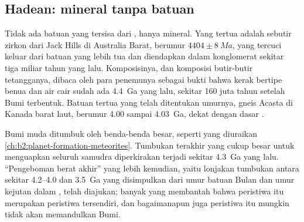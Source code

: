 \begin{omfigure}
\par{}
\end{omfigure}

\subsection*{Hadean: mineral tanpa batuan}

Tidak ada batuan yang tersisa dari , hanya mineral. Yang tertua adalah sebutir zirkon dari Jack
Hills di Australia Barat, berumur $4404 \pm \qty{8}{Ma}$, yang tercuci keluar dari batuan yang lebih tua dan diendapkan
dalam konglomerat sekitar tiga miliar tahun yang lalu. Komposisinya, dan komposisi butir-butir
tetangganya, dibaca oleh para penemunya sebagai bukti bahwa kerak bertipe benua dan
air cair sudah ada \qty{4.4}{Ga} yang lalu, sekitar 160 juta tahun setelah Bumi
terbentuk. Batuan tertua yang telah ditentukan umurnya, gneis Acasta di Kanada barat laut, berumur 4.00 sampai
\qty{4.03}{Ga}, dekat dengan dasar .

Bumi muda ditumbuk oleh benda-benda besar, seperti yang diuraikan \cref{ch:b2:planet-formation-meteorites}.
Tumbukan terakhir yang cukup besar untuk menguapkan
seluruh samudra diperkirakan terjadi sekitar \qty{4.3}{Ga} yang lalu. ``Pengeboman berat
akhir'' yang lebih kemudian, yaitu lonjakan tumbukan antara sekitar 4.2--4.0 dan \qty{3.5}{Ga} yang disimpulkan dari
umur batuan Bulan dan umur kejutan dalam , telah diajukan; banyak yang membantah bahwa peristiwa itu
merupakan peristiwa tersendiri, dan bagaimanapun juga peristiwa itu mungkin tidak akan memandulkan Bumi.

